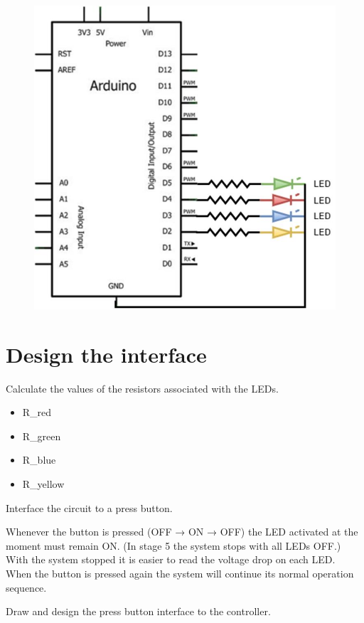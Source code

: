 \documentclass[10pt]{article}
\begin{document}
\begin{figure}[H]
    \centering
    \includegraphics{arduino.jpg}
\end{figure}

\section{Design the interface}

Calculate the values of the resistors associated with the LEDs.

\begin{itemize}[label={}]
    \item R\_red
    \item R\_green
    \item R\_blue
    \item R\_yellow
\end{itemize}

Interface the circuit to a press button.

Whenever the button is pressed (OFF → ON → OFF) the LED activated at the moment must
remain ON. (In stage 5 the system stops with all LEDs OFF.) With the system stopped it is
easier to read the voltage drop on each LED. When the button is pressed again the system
will continue its normal operation sequence.

Draw and design the press button interface to the controller.
\end{document}
